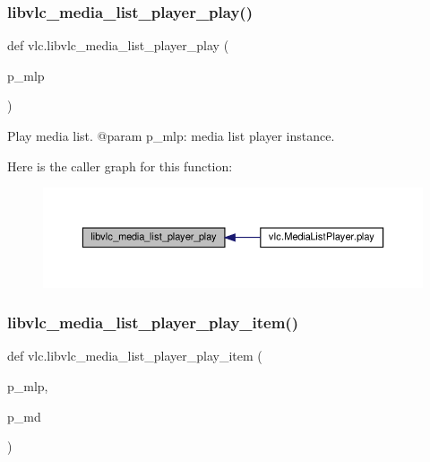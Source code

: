 \subsubsection{\texorpdfstring{libvlc\+\_\+media\+\_\+list\+\_\+player\+\_\+play()}{libvlc\_media\_list\_player\_play()}}
{\footnotesize\ttfamily def vlc.\+libvlc\+\_\+media\+\_\+list\+\_\+player\+\_\+play (\begin{DoxyParamCaption}\item[{}]{p\+\_\+mlp }\end{DoxyParamCaption})}

\begin{DoxyVerb}Play media list.
@param p_mlp: media list player instance.
\end{DoxyVerb}
 Here is the caller graph for this function\+:
\nopagebreak
\begin{figure}[H]
\begin{center}
\leavevmode
\includegraphics[width=350pt]{namespacevlc_a613ec3b14b03b7c91c89783e633bc031_icgraph}
\end{center}
\end{figure}
\mbox{\label{namespacevlc_a222147643807a3c36fe41538526528d9}} 
\subsubsection{\texorpdfstring{libvlc\+\_\+media\+\_\+list\+\_\+player\+\_\+play\+\_\+item()}{libvlc\_media\_list\_player\_play\_item()}}
{\footnotesize\ttfamily def vlc.\+libvlc\+\_\+media\+\_\+list\+\_\+player\+\_\+play\+\_\+item (\begin{DoxyParamCaption}\item[{}]{p\+\_\+mlp,  }\item[{}]{p\+\_\+md }\end{DoxyParamCaption})}

